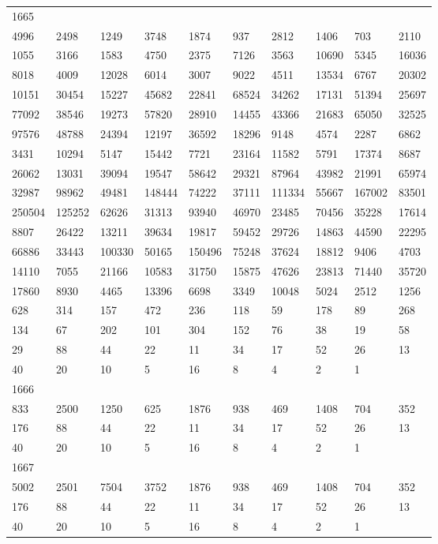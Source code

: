 \begin{longtable}{*{10}{l}}
1665&&&&&&&&&\\
4996& 2498& 1249& 3748& 1874& 937& 2812& 1406& 703& 2110\\
1055& 3166& 1583& 4750& 2375& 7126& 3563& 10690& 5345& 16036\\
8018& 4009& 12028& 6014& 3007& 9022& 4511& 13534& 6767& 20302\\
10151& 30454& 15227& 45682& 22841& 68524& 34262& 17131& 51394& 25697\\
77092& 38546& 19273& 57820& 28910& 14455& 43366& 21683& 65050& 32525\\
97576& 48788& 24394& 12197& 36592& 18296& 9148& 4574& 2287& 6862\\
3431& 10294& 5147& 15442& 7721& 23164& 11582& 5791& 17374& 8687\\
26062& 13031& 39094& 19547& 58642& 29321& 87964& 43982& 21991& 65974\\
32987& 98962& 49481& 148444& 74222& 37111& 111334& 55667& 167002& 83501\\
250504& 125252& 62626& 31313& 93940& 46970& 23485& 70456& 35228& 17614\\
8807& 26422& 13211& 39634& 19817& 59452& 29726& 14863& 44590& 22295\\
66886& 33443& 100330& 50165& 150496& 75248& 37624& 18812& 9406& 4703\\
14110& 7055& 21166& 10583& 31750& 15875& 47626& 23813& 71440& 35720\\
17860& 8930& 4465& 13396& 6698& 3349& 10048& 5024& 2512& 1256\\
628& 314& 157& 472& 236& 118& 59& 178& 89& 268\\
134& 67& 202& 101& 304& 152& 76& 38& 19& 58\\
29& 88& 44& 22& 11& 34& 17& 52& 26& 13\\
40& 20& 10& 5& 16& 8& 4& 2& 1& \\

1666&&&&&&&&&\\
833& 2500& 1250& 625& 1876& 938& 469& 1408& 704& 352\\
176& 88& 44& 22& 11& 34& 17& 52& 26& 13\\
40& 20& 10& 5& 16& 8& 4& 2& 1& \\

1667&&&&&&&&&\\
5002& 2501& 7504& 3752& 1876& 938& 469& 1408& 704& 352\\
176& 88& 44& 22& 11& 34& 17& 52& 26& 13\\
40& 20& 10& 5& 16& 8& 4& 2& 1& \\


\end{longtable}
